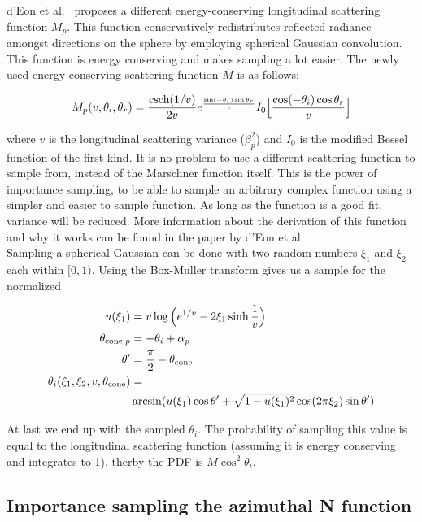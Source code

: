 \documentclass[11pt,a4paper]{report}
\begin{document}
d'Eon et al.~\cite{eon2011} proposes a different energy-conserving longitudinal scattering function $M_p$. This function conservatively redistributes reflected radiance amongst directions on the sphere by employing spherical Gaussian convolution. This function is energy conserving and makes sampling a lot easier. The newly used energy conserving scattering function $M$ is as follows:

\begin{equation}
M_p(v, \theta_i, \theta_r) = \frac{\textnormal{csch}(1/v)}{2v} e^{\frac{\sin(-\theta_i)\sin\theta_r}{v}} I_0 \Big [ \frac{\cos(-\theta_i) \cos \theta_r}{v} \Big ]
\end{equation}

where $v$ is the longitudinal scattering variance ($\beta_p^2$) and $I_0$ is the modified Bessel function of the first kind. It is no problem to use a different scattering function to sample from, instead of the Marschner function itself. This is the power of importance sampling, to be able to sample an arbitrary complex function using a simpler and easier to sample function. As long as the function is a good fit, variance will be reduced. More information about the derivation of this function and why it works can be found in the paper by d'Eon et al.~\cite{eon2011}.\\

Sampling a spherical Gaussian can be done with two random numbers $\xi_1$ and $\xi_2$ each within $[0, 1)$. Using the Box-Muller transform gives us a sample for the normalized


\begin{align}
u(\xi_1) &= v \log \Big (e^{1/v} - 2\xi_1 \sinh \frac{1}{v} \Big ) \\
\theta_{\textnormal{cone}, p} &= -\theta_i + \alpha_p\\
\theta' &= \frac{\pi}{2} - \theta_{\textnormal{cone}} \\
\theta_i(\xi_1, \xi_2, v, \theta_{\textnormal{cone}}) &= \nonumber \\
& \arcsin(u(\xi_1) \cos \theta' + \sqrt{1 - u(\xi_1)^2} \cos(2\pi \xi_2) \sin \theta')
\end{align}

At last we end up with the sampled $\theta_i$. The probability of sampling this value is equal to the longitudinal scattering function (assuming it is energy conserving and integrates to 1), therby the PDF is $M \cos^2 \theta_i$.


\subsection{Importance sampling the azimuthal N function}
\end{document}
